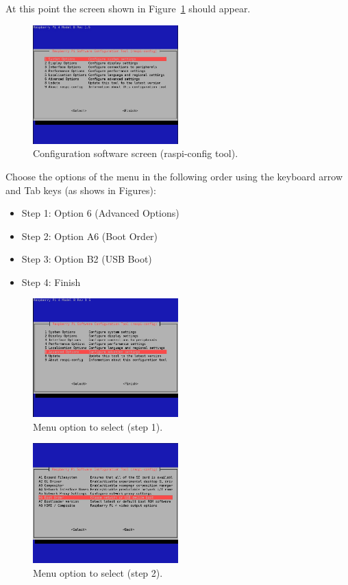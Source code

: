 \documentclass[11pt,a4paper]{article}
\begin{document}
At this point the screen shown in Figure~\ref{fig:screen3} should appear.

\begin{figure}[!ht]
  \centering
  \includegraphics[width=0.5\textwidth]{pictures/screen3.jpg}
  \caption{Configuration software screen (raspi-config tool).}
  \label{fig:screen3}
\end{figure}

Choose the options of the menu in the following order using the keyboard arrow and Tab keys (as shows in Figures):
\begin{itemize}
\item Step 1: Option 6 (Advanced Options)
\item Step 2: Option A6 (Boot Order)
\item Step 3: Option B2 (USB Boot)
\item Step 4: Finish
\end{itemize}

\begin{figure}[H]
  \centering
  \includegraphics[width=0.5\textwidth]{pictures/screen4.jpg}
  \caption{Menu option to select (step 1).}
  \label{fig:screen4}
\end{figure}

\begin{figure}[H]
  \centering
  \includegraphics[width=0.5\textwidth]{pictures/screen5.jpg}
  \caption{Menu option to select (step 2).}
  \label{fig:screen5}
\end{figure}
\end{document}
